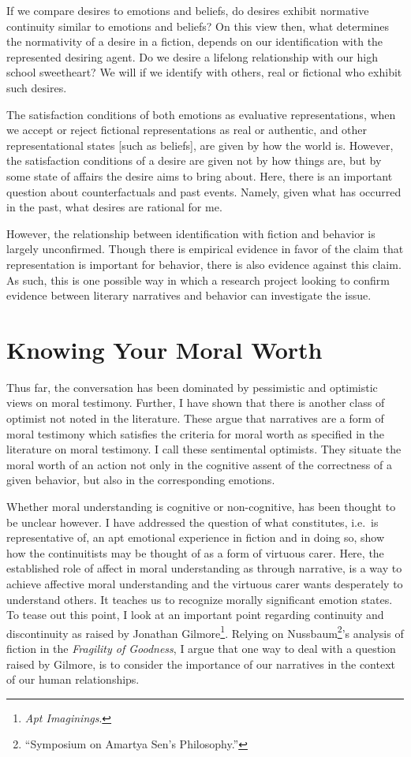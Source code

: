 \documentclass[
  12pt,
]{book}
\theoremstyle{definition}
\theoremstyle{definition}
\theoremstyle{definition}
\theoremstyle{definition}
\theoremstyle{remark}
\begin{document}
If we compare desires to emotions and beliefs, do desires exhibit normative continuity similar to emotions and beliefs? On this view then, what determines the normativity of a desire in a fiction, depends on our identification with the represented desiring agent. Do we desire a lifelong relationship with our high school sweetheart? We will if we identify with others, real or fictional who exhibit such desires.

The satisfaction conditions of both emotions as evaluative representations, when we accept or reject fictional representations as real or authentic, and other representational states {[}such as beliefs{]}, are given by how the world is. However, the satisfaction conditions of a desire are given not by how things are, but by some state of affairs the desire aims to bring about. Here, there is an important question about counterfactuals and past events. Namely, given what has occurred in the past, what desires are rational for me.

However, the relationship between identification with fiction and behavior is largely unconfirmed. Though there is empirical evidence in favor of the claim that representation is important for behavior, there is also evidence against this claim. As such, this is one possible way in which a research project looking to confirm evidence between literary narratives and behavior can investigate the issue.

\chapter{Knowing Your Moral Worth}\label{knowing-your-moral-worth}

Thus far, the conversation has been dominated by pessimistic and optimistic views on moral testimony. Further, I have shown that there is another class of optimist not noted in the literature. These argue that narratives are a form of moral testimony which satisfies the criteria for moral worth as specified in the literature on moral testimony. I call these sentimental optimists. They situate the moral worth of an action not only in the cognitive assent of the correctness of a given behavior, but also in the corresponding emotions.

Whether moral understanding is cognitive or non-cognitive, has been thought to be unclear however. I have addressed the question of what constitutes, i.e.~is representative of, an apt emotional experience in fiction and in doing so, show how the continuitists may be thought of as a form of virtuous carer. Here, the established role of affect in moral understanding as through narrative, is a way to achieve affective moral understanding and the virtuous carer wants desperately to understand others. It teaches us to recognize morally significant emotion states. To tease out this point, I look at an important point regarding continuity and discontinuity as raised by Jonathan Gilmore\footnote{\emph{Apt {Imaginings}}.}. Relying on Nussbaum\footnote{{``Symposium on {Amartya Sen}'s Philosophy.''}}'s analysis of fiction in the \emph{Fragility of Goodness}, I argue that one way to deal with a question raised by Gilmore, is to consider the importance of our narratives in the context of our human relationships.
\end{document}
